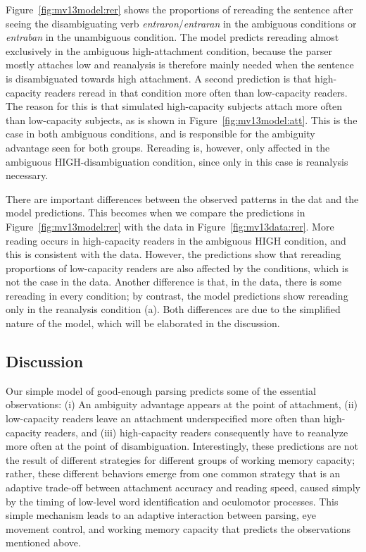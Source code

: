 \documentclass{cambridge7A}\usepackage[]{graphicx}\usepackage[]{color}
\begin{document}
Figure~\ref{fig:mv13model:rer} shows the proportions of rereading the sentence after seeing the disambiguating verb \textit{entraron}/\textit{entraran} in the ambiguous conditions or \textit{entraban} in the unambiguous condition. The model predicts rereading almost exclusively in the ambiguous high-attachment condition, because the parser mostly attaches low and reanalysis is therefore mainly needed when the sentence is disambiguated towards high attachment. A second prediction is that high-capacity readers reread in that condition more often than low-capacity readers. 
The reason for this is that simulated high-capacity subjects attach more often than low-capacity subjects, as is shown in Figure~\ref{fig:mv13model:att}. This is the case in both ambiguous conditions, and is responsible for the ambiguity advantage seen for both groups. Rereading is, however, only affected in the ambiguous HIGH-disambiguation condition, since only in this case is reanalysis necessary. 

There are important differences between the observed patterns in the dat and the model predictions. This becomes when we compare the predictions in Figure~\ref{fig:mv13model:rer} with the data in Figure~\ref{fig:mv13data:rer}. More reading occurs in high-capacity readers in the ambiguous HIGH condition, and this is consistent with the data. However, the predictions show that rereading proportions of low-capacity readers are also affected by the conditions, which is not the case in the data. Another difference is that, in the data, there is some rereading in every condition; by contrast, the model predictions show rereading only in the reanalysis condition (a). Both differences are due to the simplified nature of the model, which will be elaborated in the discussion.


\subsection{Discussion}
Our simple model of good-enough parsing predicts some of the essential observations: (i) An ambiguity advantage appears at the point of attachment, (ii) low-capacity readers leave an attachment underspecified more often than high-capacity readers, and (iii) high-capacity readers consequently have to reanalyze more often at the point of disambiguation.
Interestingly, these predictions are not the result of different strategies for different groups of working memory capacity; rather, these different behaviors emerge from one common strategy that is an adaptive trade-off between attachment accuracy and reading speed, caused simply by the timing of low-level word identification and oculomotor processes. This simple mechanism leads to an adaptive interaction between parsing, eye movement control, and working memory capacity that predicts the observations mentioned above.
\end{document}
